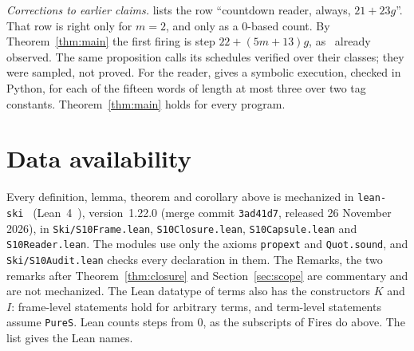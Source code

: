 \documentclass[11pt]{amsart}
\theoremstyle{definition}
\newcommand{\Fires}{\mathrm{Fires}}
\begin{document}
\emph{Corrections to earlier claims.} \citep[Proposition~1]{clocknote} lists the row ``countdown
reader, always, $21+23g$''. That row is right only for $m=2$, and only as a 0-based count. By
Theorem~\ref{thm:main} the first firing is step $22+(5m+13)g$, as~\citep{murm2} already observed.
The same proposition calls its schedules verified over their classes; they were sampled, not
proved. For the reader, \citep{murm2} gives a symbolic execution, checked in Python, for each of
the fifteen words of length at most three over two tag constants. Theorem~\ref{thm:main} holds for
every program.

\section*{Data availability}
\sloppy
Every definition, lemma, theorem and corollary above is mechanized in
\texttt{lean-ski}~\citep{leanski} (Lean~4~\citep{lean4}), version~1.22.0 (merge commit
\texttt{3ad41d7}, released 26 November 2026), in \texttt{Ski/S10Frame.lean},
\texttt{S10Closure.lean}, \texttt{S10Capsule.lean} and \texttt{S10Reader.lean}. The modules use
only the axioms \texttt{propext} and \texttt{Quot.sound}, and \texttt{Ski/S10Audit.lean} checks
every declaration in them. The Remarks, the two remarks after Theorem~\ref{thm:closure} and
Section~\ref{sec:scope} are commentary and are not mechanized. The Lean datatype of terms also has
the constructors $K$ and $I$: frame-level statements hold for arbitrary terms, and term-level
statements assume \texttt{PureS}. Lean counts steps from $0$, as the subscripts of $\Fires$ do
above. The list gives the Lean names.
\end{document}
